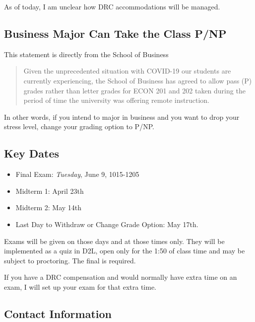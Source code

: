 \documentclass[
]{article}
\providecommand{\tightlist}{%
  \setlength{\itemsep}{0pt}\setlength{\parskip}{0pt}}
\begin{document}
As of today, I am unclear how DRC accommodations will be managed.

\hypertarget{business-major-can-take-the-class-pnp}{%
\subsection{Business Major Can Take the Class
P/NP}\label{business-major-can-take-the-class-pnp}}

This statement is directly from the School of Business

\begin{quote}
Given the unprecedented situation with COVID-19 our students are
currently experiencing, the School of Business has agreed to allow pass
(P) grades rather than letter grades for ECON 201 and 202 taken during
the period of time the university was offering remote instruction.
\end{quote}

In other words, if you intend to major in business and you want to drop
your stress level, change your grading option to P/NP.

\hypertarget{key-dates}{%
\subsection{Key Dates}\label{key-dates}}

\begin{itemize}
\tightlist
\item
  Final Exam: \emph{Tuesday}, June 9, 1015-1205
\item
  Midterm 1: April 23th
\item
  Midterm 2: May 14th
\item
  Last Day to Withdraw or Change Grade Option: May 17th.
\end{itemize}

Exams will be given on those days and at those times only. They will be
implemented as a quiz in D2L, open only for the 1:50 of class time and
may be subject to proctoring. The final is required.

If you have a DRC compensation and would normally have extra time on an
exam, I will set up your exam for that extra time.

\hypertarget{contact-information}{%
\subsection{Contact Information}\label{contact-information}}
\end{document}
